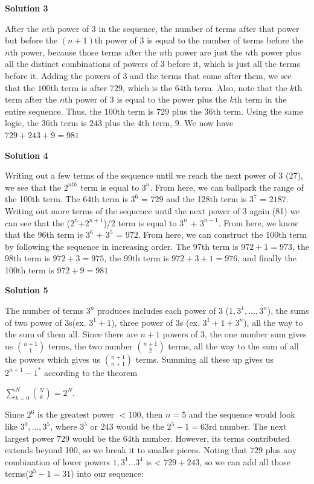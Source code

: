 \begin{enumerate}
\textbf{Solution 3}

After the $n$th power of 3 in the sequence, the number of terms after that power but before the $(n+1)$th power of 3 is equal to the number of terms before the $n$th power, because those terms after the $n$th power are just the $n$th power plus all the distinct combinations of powers of 3 before it, which is just all the terms before it. Adding the powers of $3$ and the terms that come after them, we see that the $100$th term is after $729$, which is the $64$th term. Also, note that the $k$th term after the $n$th power of 3 is equal to the power plus the $k$th term in the entire sequence. Thus, the $100$th term is $729$ plus the $36$th term. Using the same logic, the $36$th term is $243$ plus the $4$th term, $9$. We now have $729+243+9=\boxed{981}$




\textbf{Solution 4}

Writing out a few terms of the sequence until we reach the next power of 3 (27), we see that the $2^{nth}$ term is equal to $3^n$. From here, we can ballpark the range of the 100th term. The 64th term is $3^6$ = $729$ and the 128th term is $3^7$ = $2187$. Writing out more terms of the sequence until the next power of 3 again (81) we can see that the ($2^n$+$2^{n+1}$)/2 term is equal to $3^n$ + $3^{n-1}$. From here, we know that the 96th term is $3^6$ + $3^5$ = $972$. From here, we can construct the 100th term by following the sequence in increasing order. The 97th term is $972 + 1 = 973$, the 98th term is $972 + 3 = 975$, the 99th term is $972 + 3 + 1 = 976$, and finally the 100th term is $972 + 9 = \boxed{981}$




\textbf{Solution 5}

The number of terms $3^n$ produces includes each power of 3 ($1, 3^1, ..., 3^n$), the sums of two power of 3s(ex. $3^1 + 1$), three power of 3s (ex. $3^1 + 1 + 3^n$), all the way to the sum of them all. Since there are $n+1$ powers of 3, the one number sum gives us ${n+1\choose 1}$ terms, the two number ${n+1\choose 2}$ terms, all the way to the sum of all the powers which gives us ${n+1\choose n+1}$ terms. Summing all these up gives us $2^{n+1} - 1 ^ {*}$ according to the theorem 

 $\sum_{k=0}^N{{N}\choose{k}} = 2^N$.

 Since $2^6$ is the greatest power $<100$, then $n=5$ and the sequence would look like {$3^0, ..., 3^5$}, where $3^5$ or $243$ would be the $2^5 - 1 = 63$rd number. The next largest power $729$ would be the 64th number. However, its terms contributed extends beyond 100, so we break it to smaller pieces. Noting that $729$ plus any combination of lower powers ${1, 3^1 . . .3^4}$ is < $729 + 243$, so we can add all those terms($2^5 - 1 = 31$) into our sequence:


\end{enumerate}
